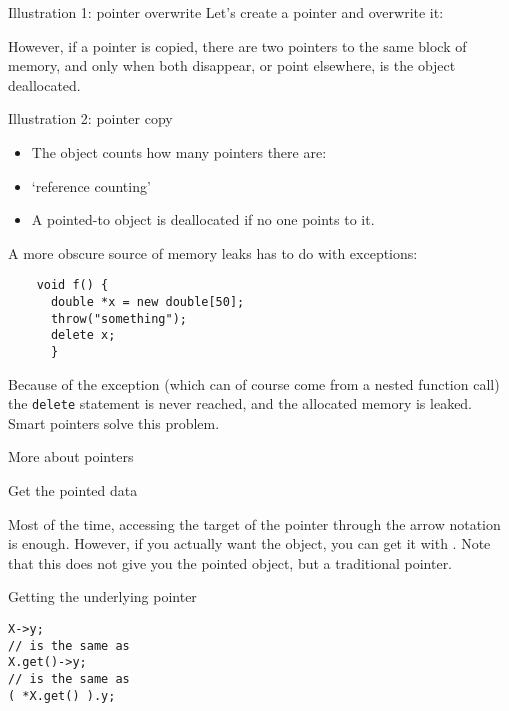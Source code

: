 \begin{block}{Illustration 1: pointer overwrite}
  \label{sl:shared-ptr-overwrite}
  Let's create a pointer and overwrite it:
\end{block}

However, if a pointer is copied, there are two pointers to the same
block of memory, and only when both disappear, or point elsewhere, is
the object deallocated.

\begin{block}{Illustration 2: pointer copy}
  \label{sl:shared-ptr-copy}
  \begin{itemize}
  \item The object counts how many pointers there are:
  \item `reference counting'
  \item A pointed-to object is deallocated if no one points to it.
  \end{itemize}
\end{block}

\begin{remark}
  A more obscure source of memory leaks has to do with exceptions:
  \begin{lstlisting}
    void f() {
      double *x = new double[50];
      throw("something");
      delete x;
      }
  \end{lstlisting}
  Because of the exception
  (which can of course come from a nested function call)
  the \lstinline{delete} statement is never reached,
  and the allocated memory is leaked.
  Smart pointers solve this problem.
\end{remark}

 {More about pointers}

 {Get the pointed data}

Most of the time, accessing the target of the pointer through the
arrow notation is enough. However, if you actually want the object,
you can get it with . Note that this does not give
you the pointed object, but a traditional pointer.

\begin{block}{Getting the underlying pointer}
  \label{sl:pointer-get}
\begin{lstlisting}
X->y;
// is the same as
X.get()->y;
// is the same as
( *X.get() ).y;
\end{lstlisting}

\end{block}

